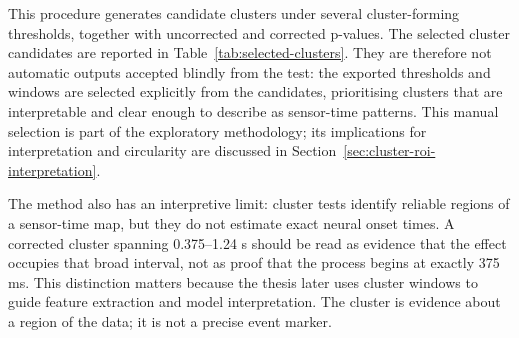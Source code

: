 \documentclass[11pt,a4paper,chapterprefix=false,parskip=false]{scrreprt}
\begin{document}
This procedure generates candidate clusters under several cluster-forming thresholds, together with uncorrected and corrected p-values. The selected cluster candidates are reported in Table~\ref{tab:selected-clusters}. They are therefore not automatic outputs accepted blindly from the test: the exported thresholds and windows are selected explicitly from the candidates, prioritising clusters that are interpretable and clear enough to describe as sensor-time patterns. This manual selection is part of the exploratory methodology; its implications for interpretation and circularity are discussed in Section~\ref{sec:cluster-roi-interpretation}.

The method also has an interpretive limit: cluster tests identify reliable regions of a sensor-time map, but they do not estimate exact neural onset times. A corrected cluster spanning 0.375--1.24 s should be read as evidence that the effect occupies that broad interval, not as proof that the process begins at exactly 375 ms. This distinction matters because the thesis later uses cluster windows to guide feature extraction and model interpretation. The cluster is evidence about a region of the data; it is not a precise event marker.
\end{document}
